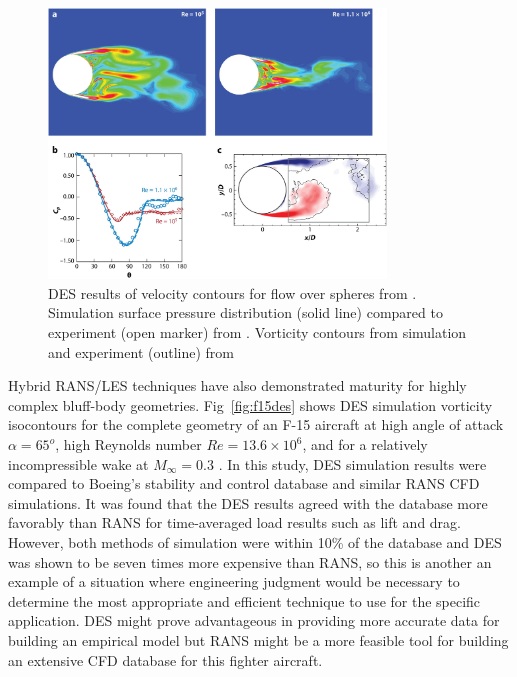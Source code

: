 \documentclass[journal]{new-aiaa}
\begin{document}
\begin{figure}[H]
\begin{center}
\includegraphics[width=0.8\textwidth]{Images/logan/spalart2009detachededdy_SphereSeparation.jpeg}
\caption{ DES results of velocity contours for flow over spheres from \cite{spalart2009detachededdy}. Simulation surface pressure distribution (solid line) compared to experiment (open marker) from \cite{squires2004detachededdy}.  Vorticity contours from simulation and experiment (outline) from \cite{mockett2008demonstration} }
\label{fig:desspherevalidation}
\end{center}
\end{figure}








Hybrid RANS/LES techniques have also demonstrated maturity for highly complex bluff-body geometries. Fig~\ref{fig:f15des} shows DES simulation vorticity isocontours for the complete geometry of an F-15 aircraft at high angle of attack $\alpha=65^o$, high Reynolds number $Re=13.6\times10^6$, and for a relatively incompressible wake at $M_{\infty}=0.3$ \cite{forsythe2004detachededdy}. In this study, DES simulation results were compared to Boeing’s stability and control database and similar RANS CFD simulations. It was found that the DES results agreed with the database more favorably than RANS for time-averaged load results such as lift and drag. However, both methods of simulation were within 10\% of the database and DES was shown to be seven times more expensive than RANS, so this is another an example of a situation where engineering judgment would be necessary to determine the most appropriate and efficient technique to use for the specific application. DES might prove advantageous in providing more accurate data for building an empirical model but RANS might be a more feasible tool for building an extensive CFD database for this fighter aircraft.
\end{document}
